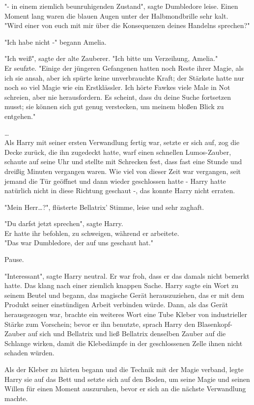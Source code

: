 {"- in einem ziemlich beunruhigenden Zustand", sagte Dumbledore leise. Einen Moment lang waren die blauen Augen unter der Halbmondbrille sehr kalt.\\ "Wird einer von euch mit mir über die Konsequenzen deines Handelns sprechen?"

"Ich habe nicht -" begann Amelia.

"Ich weiß", sagte der alte Zauberer. "Ich bitte um Verzeihung, Amelia."\\ Er seufzte. "Einige der jüngeren Gefangenen hatten noch Reste ihrer Magie, als ich sie ansah, aber ich spürte keine unverbrauchte Kraft; der Stärkste hatte nur noch so viel Magie wie ein Erstklässler. Ich hörte Fawkes viele Male in Not schreien, aber nie herausfordern. Es scheint, dass du deine Suche fortsetzen musst; sie können sich gut genug verstecken, um meinem bloßen Blick zu entgehen."

…\\ Als Harry mit seiner ersten Verwandlung fertig war, setzte er sich auf, zog die Decke zurück, die ihn zugedeckt hatte, warf einen schnellen Lumos-Zauber, schaute auf seine Uhr und stellte mit Schrecken fest, dass fast eine Stunde und dreißig Minuten vergangen waren. Wie viel von dieser Zeit war vergangen, seit jemand die Tür geöffnet und dann wieder geschlossen hatte - Harry hatte natürlich nicht in diese Richtung geschaut -, das konnte Harry nicht erraten.

"Mein Herr…?", flüsterte Bellatrix' Stimme, leise und sehr zaghaft.

"Du darfst jetzt sprechen", sagte Harry.\\ Er hatte ihr befohlen, zu schweigen, während er arbeitete.\\ "Das war Dumbledore, der auf uns geschaut hat."

Pause.

"Interessant", sagte Harry neutral. Er war froh, dass er das damals nicht bemerkt hatte. Das klang nach einer ziemlich knappen Sache. Harry sagte ein Wort zu seinem Beutel und begann, das magische Gerät herauszuziehen, das er mit dem Produkt seiner einstündigen Arbeit verbinden würde. Dann, als das Gerät herausgezogen war, brachte ein weiteres Wort eine Tube Kleber von industrieller Stärke zum Vorschein; bevor er ihn benutzte, sprach Harry den Blasenkopf-Zauber auf sich und Bellatrix und ließ Bellatrix denselben Zauber auf die Schlange wirken, damit die Klebedämpfe in der geschlossenen Zelle ihnen nicht schaden würden.

Als der Kleber zu härten begann und die Technik mit der Magie verband, legte Harry sie auf das Bett und setzte sich auf den Boden, um seine Magie und seinen Willen für einen Moment auszuruhen, bevor er sich an die nächste Verwandlung machte.

}
